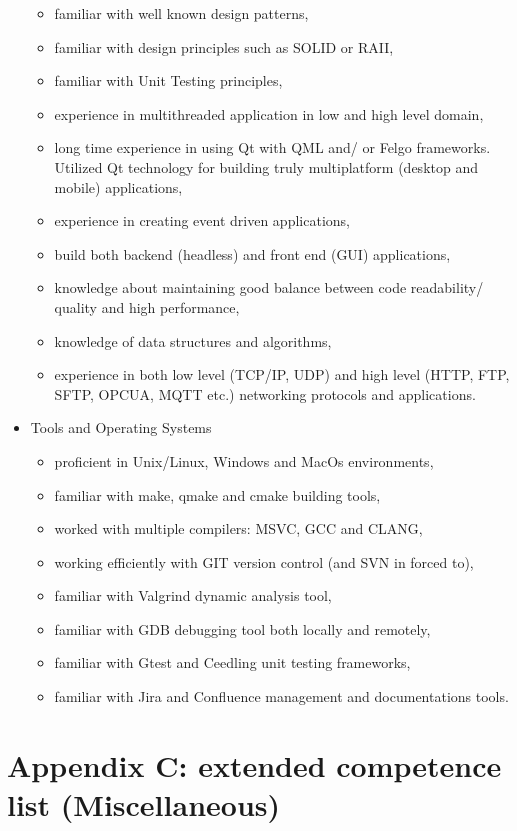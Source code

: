 \documentclass{tccv}
\begin{document}
\begin{itemize}
\begin{itemize}
			\item familiar with well known design patterns,
			\item familiar with design principles such as SOLID or RAII,
			\item familiar with Unit Testing principles,
			\item experience in multithreaded application in low and high level domain,
			\item long time experience in using Qt with QML and/ or Felgo frameworks. Utilized Qt technology for building truly multiplatform (desktop and mobile) applications,
			\item experience in creating event driven applications,
			\item build both backend (headless) and front end (GUI) applications,
			\item knowledge about maintaining good balance between code readability/ quality and high performance,
			\item knowledge of data structures and algorithms,
			\item experience in both low level (TCP/IP, UDP) and high level (HTTP, FTP, SFTP, OPCUA, MQTT etc.) networking protocols and applications.
		\end{itemize}
	\item Tools and Operating Systems
		\begin{itemize}
			\item proficient in Unix/Linux, Windows and MacOs environments,
			\item familiar with make, qmake and cmake building tools,
			\item worked with multiple compilers: MSVC, GCC and CLANG,
			\item working efficiently with GIT version control (and SVN in forced to),
			\item familiar with Valgrind dynamic analysis tool,
			\item familiar with GDB debugging tool both locally and remotely,		
			\item familiar with Gtest and Ceedling unit testing frameworks, 	
			\item familiar with Jira and Confluence management and documentations tools.		
			
		\end{itemize}
\end{itemize}

\clearpage

\section{Appendix C: extended competence list (Miscellaneous)}
\end{document}
